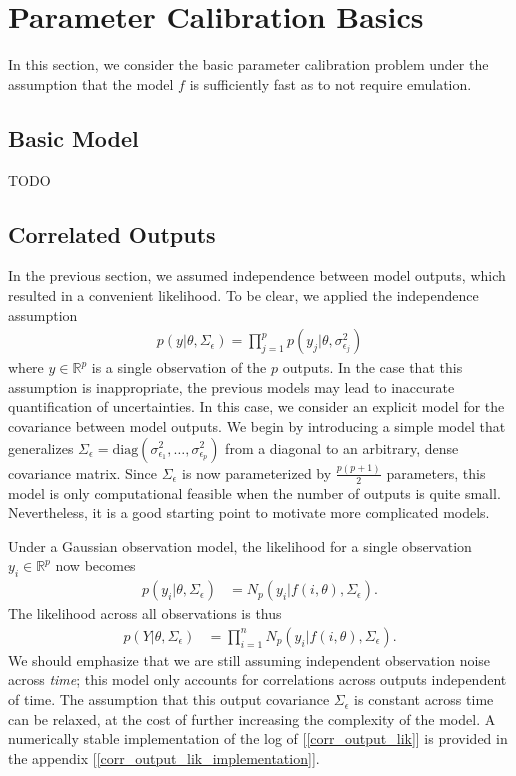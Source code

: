 \documentclass[12pt]{article}
\newcommand{\R}{\mathbb{R}}
\begin{document}
\section{Parameter Calibration Basics}
In this section, we consider the basic parameter calibration problem under the assumption that the model $f$ is sufficiently fast as to not require emulation. 

\subsection{Basic Model}
TODO

\subsection{Correlated Outputs}
In the previous section, we assumed independence between model outputs, which resulted in a convenient likelihood. To be clear, we applied the independence assumption
\begin{align}
p(y|\theta, \Sigma_\epsilon) = \prod_{j = 1}^{p} p(y_j|\theta, \sigma_{\epsilon_j}^2)
\end{align}
where $y \in \R^p$ is a single observation of the $p$ outputs. In the case that this assumption is inappropriate, the previous models may lead to inaccurate 
quantification of uncertainties. In this case, we consider an explicit model for the covariance between model outputs. We begin by introducing a simple model 
that generalizes $\Sigma_\epsilon = \text{diag}\left(\sigma_{\epsilon_1}^2, \dots, \sigma_{\epsilon_p}^2\right)$ from a diagonal to an arbitrary, dense covariance 
matrix. Since $\Sigma_\epsilon$ is now parameterized by $\frac{p(p+1)}{2}$ parameters, this model is only computational feasible when the number of outputs is 
quite small. Nevertheless, it is a good starting point to motivate more complicated models. 

Under a Gaussian observation model, the likelihood for a single observation $y_i \in \R^p$ now becomes 
\begin{align}
p(y_i|\theta, \Sigma_\epsilon) &= N_p(y_i|f(i, \theta), \Sigma_\epsilon).
\end{align}
The likelihood across all observations is thus
\begin{align}
p(Y|\theta, \Sigma_\epsilon) &= \prod_{i = 1}^{n} N_p(y_i|f(i, \theta), \Sigma_\epsilon). \label{corr_output_lik}
\end{align}
We should emphasize that we are still assuming independent observation noise across \textit{time}; this model only accounts for correlations across outputs 
independent of time. The assumption that this output covariance $\Sigma_\epsilon$ is constant across time can be relaxed, at the cost of further increasing the 
complexity of the model. A numerically stable implementation of the log of [\ref{corr_output_lik}] is provided in the appendix [\ref{corr_output_lik_implementation}].
\end{document}
